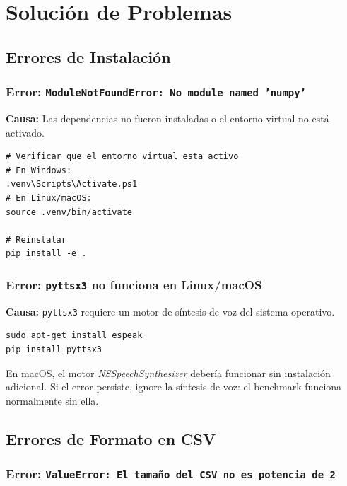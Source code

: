 \section{Solución de Problemas}
\label{sec:problemas}

\subsection{Errores de Instalación}

\subsubsection{Error: \texttt{ModuleNotFoundError: No module named 'numpy'}}

\textbf{Causa:} Las dependencias no fueron instaladas o el entorno virtual no está activado.

\begin{lstlisting}[style=shell, caption={Solución: reinstalar dependencias.}]
# Verificar que el entorno virtual esta activo
# En Windows:
.venv\Scripts\Activate.ps1
# En Linux/macOS:
source .venv/bin/activate

# Reinstalar
pip install -e .
\end{lstlisting}

\subsubsection{Error: \texttt{pyttsx3} no funciona en Linux/macOS}

\textbf{Causa:} \lstinline|pyttsx3| requiere un motor de síntesis de voz del sistema operativo.

\begin{lstlisting}[style=shell, caption={Instalar dependencia de voz en Ubuntu.}]
sudo apt-get install espeak
pip install pyttsx3
\end{lstlisting}

En macOS, el motor \textit{NSSpeechSynthesizer} debería funcionar sin instalación adicional. Si el error persiste, ignore la síntesis de voz: el benchmark funciona normalmente sin ella.

\subsection{Errores de Formato en CSV}

\subsubsection{Error: \texttt{ValueError: El tamaño del CSV no es potencia de 2}}

